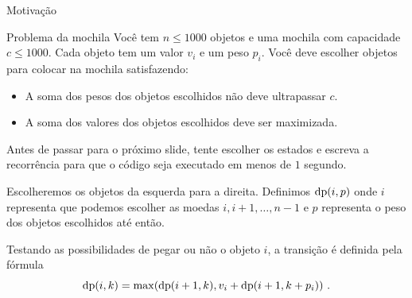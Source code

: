 \begin{frame}{Motivação}

    \begin{block}{Problema da mochila}
        \footnotesize
        Você tem $n \leq 1000$ objetos e uma mochila com capacidade $c \leq 1000$. Cada objeto tem um valor $v_i$ e um peso $p_i$. Você deve escolher objetos para colocar na mochila satisfazendo:
        \begin{itemize}
            \item A soma dos pesos dos objetos escolhidos não deve ultrapassar $c$.
            \item A soma dos valores dos objetos escolhidos deve ser maximizada.
        \end{itemize}
    \end{block}

    Antes de passar para o próximo slide, tente escolher os estados e escreva a recorrência para que o código seja executado em menos de $1$ segundo.

    Escolheremos os objetos da esquerda para a direita. Definimos $\operatorname{dp}(i, p)$ onde $i$ representa que podemos escolher as moedas $i, i+1, \dots, n-1$ e $p$ representa o peso dos objetos escolhidos até então. 

    Testando as possibilidades de pegar ou não o objeto $i$, a transição é definida pela fórmula
        \[ \operatorname{dp}(i, k) = \max(\operatorname{dp}(i+1, k), v_i + \operatorname{dp}(i+1, k+p_i)) \ . \]

    

\end{frame}

